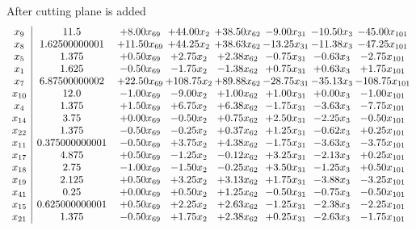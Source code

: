 \documentclass[8pt]{article}
\begin{document}
 After cutting plane is added 
\[\begin{array}{c| c c@{\hskip 2pt} c@{\hskip 2pt} c@{\hskip 2pt} c@{\hskip 2pt} c@{\hskip 2pt} c@{\hskip 2pt} }
 x_{9}   &  11.5 & +  8.00 x_{69} & + 44.00 x_{2} & + 38.50 x_{62} & -9.00 x_{31} & -10.50 x_{3} & -45.00 x_{101}\\
 x_{8}   &  1.62500000001 & + 11.50 x_{69} & + 44.25 x_{2} & + 38.63 x_{62} & -13.25 x_{31} & -11.38 x_{3} & -47.25 x_{101}\\
 x_{5}   &  1.375 & +  0.50 x_{69} & +  2.75 x_{2} & +  2.38 x_{62} & -0.75 x_{31} & -0.63 x_{3} & -2.75 x_{101}\\
 x_{1}   &  1.625 & -0.50 x_{69} & -1.75 x_{2} & -1.38 x_{62} & +  0.75 x_{31} & +  0.63 x_{3} & +  1.75 x_{101}\\
 x_{7}   &  6.87500000002 & + 22.50 x_{69} & + 108.75 x_{2} & + 89.88 x_{62} & -28.75 x_{31} & -35.13 x_{3} & -108.75 x_{101}\\
 x_{10}   &  12.0 & -1.00 x_{69} & -9.00 x_{2} & +  1.00 x_{62} & +  1.00 x_{31} & +  0.00 x_{3} & -1.00 x_{101}\\
 x_{4}   &  1.375 & +  1.50 x_{69} & +  6.75 x_{2} & +  6.38 x_{62} & -1.75 x_{31} & -3.63 x_{3} & -7.75 x_{101}\\
 x_{14}   &  3.75 & +  0.00 x_{69} & -0.50 x_{2} & +  0.75 x_{62} & +  2.50 x_{31} & -2.25 x_{3} & -0.50 x_{101}\\
 x_{22}   &  1.375 & -0.50 x_{69} & -0.25 x_{2} & +  0.37 x_{62} & +  1.25 x_{31} & -0.62 x_{3} & +  0.25 x_{101}\\
 x_{11}   &  0.375000000001 & -0.50 x_{69} & +  3.75 x_{2} & +  4.38 x_{62} & -1.75 x_{31} & -3.63 x_{3} & -3.75 x_{101}\\
 x_{17}   &  4.875 & +  0.50 x_{69} & -1.25 x_{2} & -0.12 x_{62} & +  3.25 x_{31} & -2.13 x_{3} & +  0.25 x_{101}\\
 x_{18}   &  2.75 & -1.00 x_{69} & -1.50 x_{2} & -0.25 x_{62} & +  3.50 x_{31} & -1.25 x_{3} & +  0.50 x_{101}\\
 x_{19}   &  2.125 & +  0.50 x_{69} & +  3.25 x_{2} & +  3.13 x_{62} & +  1.75 x_{31} & -3.88 x_{3} & -3.25 x_{101}\\
 x_{41}   &  0.25 & +  0.00 x_{69} & +  0.50 x_{2} & +  1.25 x_{62} & -0.50 x_{31} & -0.75 x_{3} & -0.50 x_{101}\\
 x_{15}   &  0.625000000001 & +  0.50 x_{69} & +  2.25 x_{2} & +  2.63 x_{62} & -1.25 x_{31} & -2.38 x_{3} & -2.25 x_{101}\\
 x_{21}   &  1.375 & -0.50 x_{69} & +  1.75 x_{2} & +  2.38 x_{62} & +  0.25 x_{31} & -2.63 x_{3} & -1.75 x_{101}\\

\end{array}\]
\end{document}

